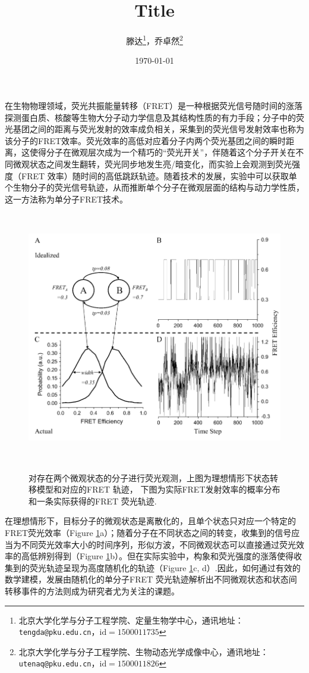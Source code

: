 \documentclass[11pt, a4paper]{article}
\begin{document}
\title{Title}
\author{滕达\footnote{北京大学化学与分子工程学院、定量生物学中心，通讯地址：\texttt{tengda@pku.edu.cn}，$\mathrm{id}=1500011735$}，乔卓然\footnote{北京大学化学与分子工程学院、生物动态光学成像中心，通讯地址：\texttt{utenaq@pku.edu.cn}，$\mathrm{id}=1500011826$}}
\date{\today}

\maketitle

在生物物理领域，荧光共振能量转移（FRET）是一种根据荧光信号随时间的涨落探测蛋白质、核酸等生物大分子动力学信息及其结构性质的有力手段；分子中的荧光基团之间的距离与荧光发射的效率成负相关，采集到的荧光信号发射效率也称为该分子的FRET效率。荧光效率的高低对应着分子内两个荧光基团之间的瞬时距离，这使得分子在微观层次成为一个精巧的“荧光开关”，伴随着这个分子开关在不同微观状态之间发生翻转，荧光同步地发生亮/暗变化，而实验上会观测到荧光强度（FRET 效率）随时间的高低跳跃轨迹。随着技术的发展，实验中可以获取单个生物分子的荧光信号轨迹，从而推断单个分子在微观层面的结构与动力学性质，这一方法称为单分子FRET技术。
\begin{figure}[htb]
  \centering
  \includegraphics[height=11cm]{Fig_trace.PNG}\\
  \caption{对存在两个微观状态的分子进行荧光观测，上图为理想情形下状态转移模型和对应的FRET 轨迹， 下图为实际FRET发射效率的概率分布和一条实际获得的FRET 荧光轨迹.}
  \label{fig:trace}
\end{figure}

在理想情形下，目标分子的微观状态是离散化的，且单个状态只对应一个特定的FRET荧光效率（Figure \ref{fig:trace}a）；随着分子在不同状态之间的转变，收集到的信号应当为不同荧光效率大小的时间序列，形似方波，不同微观状态可以直接通过荧光效率的高低辨别得到（Figure \ref{fig:trace}b）。但在实际实验中，构象和荧光强度的涨落使得收集到的荧光轨迹呈现为高度随机化的轨迹（Figure \ref{fig:trace}c, d）.因此，如何通过有效的数学建模，发展由随机化的单分子FRET 荧光轨迹解析出不同微观状态和状态间转移事件的方法则成为研究者尤为关注的课题。
\end{document}
